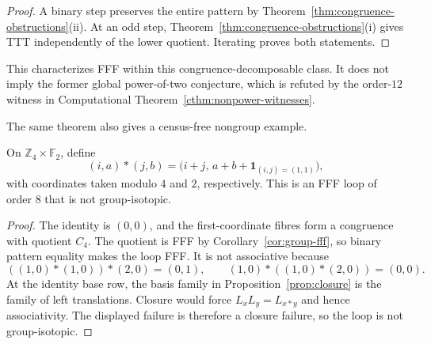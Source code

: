 \begin{proof}
A binary step preserves the entire pattern by
Theorem~\ref{thm:congruence-obstructions}(ii).  At an odd step,
Theorem~\ref{thm:congruence-obstructions}(i) gives TTT independently of the
lower quotient.  Iterating proves both statements.
\end{proof}

This characterizes FFF within this congruence-decomposable class.  It does
not imply the former global power-of-two conjecture, which is refuted by the
order-$12$ witness in Computational Theorem~\ref{cthm:nonpower-witnesses}.

The same theorem also gives a census-free nongroup example.

\begin{theorem}
\label{thm:explicit-nongroup-loop}
On $\mathbb Z_4\times\mathbb F_2$, define
\[
 (i,a)*(j,b)=
 \bigl(i+j,\,a+b+\mathbf 1_{(i,j)=(1,1)}\bigr),
\]
with coordinates taken modulo $4$ and $2$, respectively.  This is an FFF
loop of order $8$ that is not group-isotopic.
\end{theorem}

\begin{proof}
The identity is $(0,0)$, and the first-coordinate fibres form a congruence
with quotient $C_4$.  The quotient is FFF by
Corollary~\ref{cor:group-fff}, so binary pattern equality makes the loop
FFF.  It is not associative because
\[
 ((1,0)*(1,0))*(2,0)=(0,1),\qquad
 (1,0)*((1,0)*(2,0))=(0,0).
\]
At the identity base row, the basis family in
Proposition~\ref{prop:closure} is the family of left translations.
Closure would force $L_xL_y=L_{x*y}$ and hence associativity.  The displayed
failure is therefore a closure failure, so the loop is not group-isotopic.
\end{proof}
